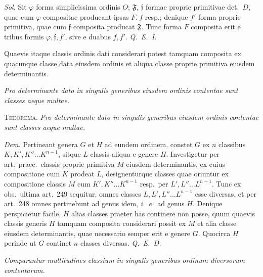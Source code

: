 \textit{Sol.} Sit $\varphi$ forma simplicissima ordinis $O$; $\mathfrak{F}$, $\mathfrak{f}$ formae proprie primitivae det.\ $D$, quae cum $\varphi$ compositae producant ipsas $F.\ f$ resp.; denique $f'$ forma proprie primitiva, quae cum $\mathfrak{f}$ composita producat $\mathfrak{F}$. Tunc forma $F$ composita erit e tribus formis $\varphi,\mathfrak{f},f'$, sive e duabus $f,f'$. \textit{Q.~E.~I.}

Quaevis itaque classis ordinis dati considerari potest tamquam composita ex quacunque classe data eiusdem ordinis et aliqua classe proprie primitiva eiusdem determinantis.

\begin{center}
\textit{Pro determinante dato in singulis generibus eiusdem ordinis contentae sunt classes aeque multae.}
\end{center}

\textsc{Theorema.} \textit{Pro determinante dato in singulis generibus eiusdem ordinis contentae sunt classes aeque multae.}

\textit{Dem.} Pertineant genera $G$ et $H$ ad eundem ordinem, constet $G$ ex $n$ classibus $K,K',K''\ldots K^{n-1}$, sitque $L$ classis aliqua e genere $H$. Investigetur per art.\ praec.\ classis proprie primitiva $M$ eiusdem determinantis, ex cuius compositione cum $K$ prodeat $L$, designenturque classes quae oriuntur ex compositione classis $M$ cum $K',K''\ldots K^{n-1}$ resp.\ per $L',L''\ldots L^{n-1}$. Tunc ex obs.\ ultima art.~249 sequitur, omnes classes $L,L',L''\ldots L^{n-1}$ esse diversas, et per art.~248 omnes pertinebunt ad genus idem, \textit{i.~e.}\ ad genus $H$. Denique perspicietur facile, $H$ alias classes praeter has continere non posse, quum quaevis classis generis $H$ tamquam composita considerari possit ex $M$ et alia classe eiusdem determinantis, quae necessario semper erit e genere $G$. Quocirca $H$ perinde ut $G$ continet $n$ classes diversas. \textit{Q.~E.~D.}
\begin{center}
\textit{Comparantur multitudines classium in singulis generibus ordinum diversorum contentarum.}
\end{center}

